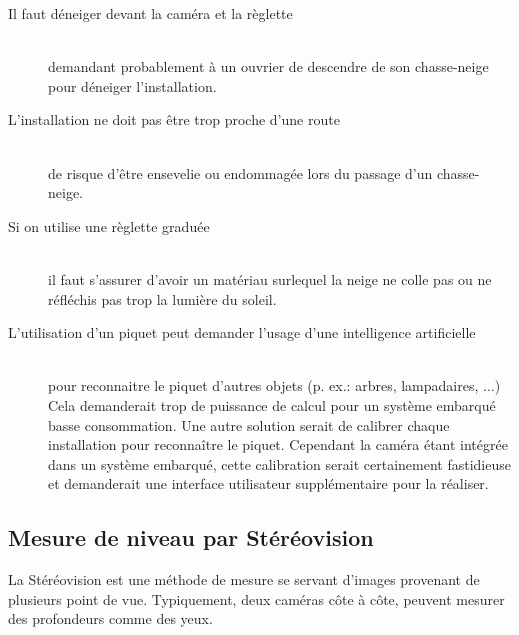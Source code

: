 \begin{description}
    \item[Il faut déneiger devant la caméra et la règlette] \hfill \\
    demandant probablement à un ouvrier de descendre de son chasse-neige pour déneiger l'installation.
    \item[L'installation ne doit pas être trop proche d'une route] \hfill \\ 
    de risque d'être ensevelie ou endommagée lors du passage d'un chasse-neige.
    \item[Si on utilise une règlette graduée] \hfill \\ 
    il faut s'assurer d'avoir un matériau surlequel la neige ne colle pas ou 
    ne réfléchis pas trop la lumière du soleil.
    \item[L'utilisation d'un piquet peut demander l'usage d'une intelligence artificielle] \hfill \\
    pour reconnaitre le piquet d'autres objets (p. ex.: arbres, lampadaires, ...) \cite{SnowTimeLapse}%
    Cela demanderait trop de puissance de calcul pour un système embarqué basse consommation.
    Une autre solution serait de calibrer chaque installation pour reconnaître le piquet.
    Cependant la caméra étant intégrée dans un système embarqué, cette calibration serait certainement
    fastidieuse et demanderait une interface utilisateur supplémentaire pour la réaliser.
\end{description}
\newpage

\subsection{Mesure de niveau par Stéréovision}
La Stéréovision est une méthode de mesure se servant d'images provenant de plusieurs point de vue.
Typiquement, deux caméras côte à côte, peuvent mesurer des profondeurs comme des yeux.

